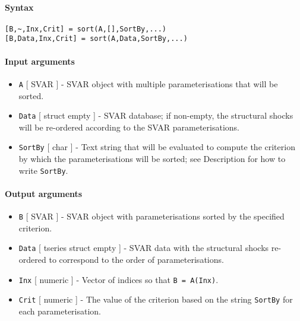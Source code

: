 


	\paragraph{Syntax}

\begin{verbatim}
[B,~,Inx,Crit] = sort(A,[],SortBy,...)
[B,Data,Inx,Crit] = sort(A,Data,SortBy,...)
\end{verbatim}

\paragraph{Input arguments}

\begin{itemize}
\item
  \texttt{A} {[} SVAR {]} - SVAR object with multiple parameterisations
  that will be sorted.
\item
  \texttt{Data} {[} struct \textbar{} empty {]} - SVAR database; if
  non-empty, the structural shocks will be re-ordered according to the
  SVAR parameterisations.
\item
  \texttt{SortBy} {[} char {]} - Text string that will be evaluated to
  compute the criterion by which the parameterisations will be sorted;
  see Description for how to write \texttt{SortBy}.
\end{itemize}

\paragraph{Output arguments}

\begin{itemize}
\item
  \texttt{B} {[} SVAR {]} - SVAR object with parameterisations sorted by
  the specified criterion.
\item
  \texttt{Data} {[} tseries \textbar{} struct \textbar{} empty {]} -
  SVAR data with the structural shocks re-ordered to correspond to the
  order of parameterisations.
\item
  \texttt{Inx} {[} numeric {]} - Vector of indices so that
  \texttt{B = A(Inx)}.
\item
  \texttt{Crit} {[} numeric {]} - The value of the criterion based on
  the string \texttt{SortBy} for each parameterisation.
\end{itemize}

